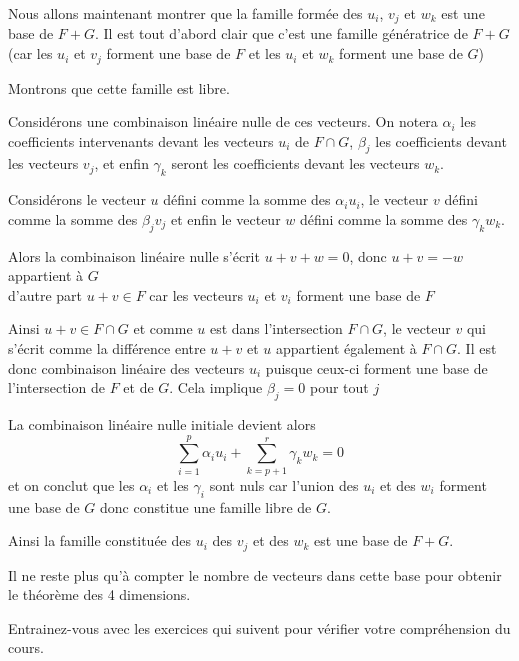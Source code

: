   
 \change Nous allons maintenant montrer que la famille formée des $u_i$, $v_j$ et $w_k$  est une base de $F+G$.
  Il est tout d'abord clair que c'est une famille génératrice de $F+G$ (car les $u_i$ et $v_j$ forment une base de $F$ et les $u_i$ et $w_k$ forment une base de $G$)  
  
  
 \change Montrons que cette famille est libre. 
 
 \change
 Considérons une combinaison linéaire nulle de ces vecteurs. On notera $\alpha_i$ les coefficients intervenants devant les vecteurs $u_i$ de $F\cap G$, $\beta_j$ les coefficients devant les vecteurs $v_j$, et enfin $\gamma_k$ seront les coefficients devant les vecteurs $w_k$.
  
 \change
 Considérons le vecteur 
$u$ défini comme la somme des $\alpha_i u_i$, le vecteur $v$ défini comme la somme des $\beta_j v_j$ et enfin le vecteur $w$ défini comme la somme des $\gamma_k w_k$.

\change
Alors la combinaison linéaire nulle s'écrit $u+v+w=0$, donc $u+v = -w$ appartient à  $G$\\


d'autre part  $u+v \in F$ car les vecteurs $u_i$ et $v_i$ forment une base de $F$

\change
Ainsi $u+v \in F\cap G$ et comme  $u$ est dans l'intersection $ F\cap G$, le vecteur $v$ qui s'écrit comme la différence entre $u+v$ et $u$ appartient également à $F\cap G$. Il est donc combinaison linéaire des vecteurs $u_i$ puisque ceux-ci forment une base de l'intersection de $F$ et de $G$. Cela implique $\beta_j=0$ pour tout $j$

\change  La combinaison linéaire nulle initiale devient alors 
  $$\sum_{i=1}^p \alpha_i u_i  + \sum_{k=p+1}^r \gamma_k w_k = 0$$ et on conclut que les $\alpha_i$ et les $\gamma_i$ sont nuls car l'union des $u_i$ et des $w_i$ forment une base de $G$ donc constitue une famille libre de $G$.
  
  \change
  Ainsi la famille constituée des $u_i$ des $v_j$ et des $w_k$ est une base de $F+G$.
  
  Il ne reste plus qu'à compter le nombre de vecteurs dans cette base pour obtenir le théorème des 4 dimensions.


\diapo
Entrainez-vous avec les exercices qui suivent pour vérifier votre compréhension du cours.




